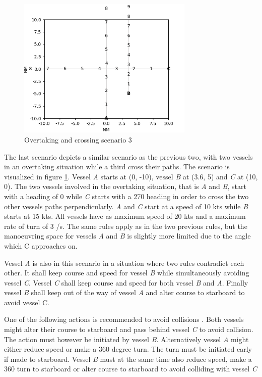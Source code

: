 \begin{figure}[H]
    \centering
    \includegraphics[width=0.75\textwidth,height=0.75\textheight,keepaspectratio]{../src/img/overtaking_crossing_2.png}
    \caption{Overtaking and crossing scenario 3 \cite{ecolreg_overtaking-and-crossing-2}}
    \label{fig:overtaking-and-crossing-2}
\end{figure}

The last scenario depicts a similar scenario as the previous two, with two vessels in an overtaking situation while a third cross their paths. The scenario is visualized in figure \ref{fig:overtaking-and-crossing-2}. Vessel \textit{A} starts at (0, -10), vessel \textit{B} at (3.6, 5) and \textit{C} at (10, 0). The two vessels involved in the overtaking situation, that is \textit{A} and \textit{B}, start with a heading of 0 \textdegree while  \textit{C} starts with a 270 \textdegree heading in order to cross the two other vessels paths perpendicularly. \textit{A} and \textit{C} start at a speed of 10 kts while \textit{B} starts at 15 kts. All vessels have as maximum speed of 20 kts and a maximum rate of turn of 3 \textdegree /s. The same rules apply as in the two previous rules, but the manoeuvring space for vessels \textit{A} and \textit{B} is slightly more limited due to the angle which C approaches on.

Vessel \textit{A} is also in this scenario in a situation where two rules contradict each other.
It shall keep course and speed for vessel \textit{B} while simultaneously avoiding vessel \textit{C}.
Vessel \textit{C} shall keep course and speed for both vessel \textit{B} and \textit{A}.
Finally vessel \textit{B} shall keep out of the way of vessel \textit{A} and alter course to starboard to avoid vessel C.

One of the following actions is recommended to avoid collisions \cite{ecolreg_overtaking-and-crossing-2}. Both vessels might alter their course to starboard and pass behind vessel \textit{C} to avoid collision. The action must however be initiated by vessel \textit{B}. Alternatively vessel \textit{A} might either reduce speed or make a 360 degree turn. The turn must be initiated early if made to starboard. Vessel \textit{B} must at the same time also reduce speed, make a 360 \textdegree turn to starboard or alter course to starboard to avoid colliding with vessel \textit{C}



